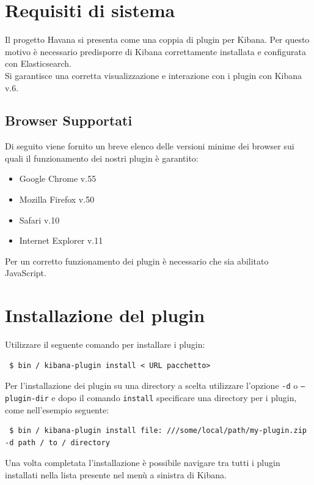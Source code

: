 \newpage
\section{Requisiti di sistema}
Il progetto Havana si presenta come una coppia di plugin per Kibana. Per questo motivo è necessario predisporre di Kibana correttamente installata e configurata con Elasticsearch.
\\ Si garantisce una corretta visualizzazione e interazione con i plugin con Kibana v.6.
\subsection{Browser Supportati}

Di seguito viene fornito un breve elenco delle versioni minime dei browser sui quali il funzionamento dei nostri plugin è garantito:
\begin{itemize}
	
	\item Google Chrome v.55
	\item Mozilla Firefox v.50
	\item Safari v.10
	\item Internet Explorer v.11
	
\end{itemize}

Per un corretto funzionamento dei plugin è necessario che sia abilitato JavaScript.

\section{Installazione del plugin}
Utilizzare il seguente comando per installare i plugin:
\begin{lstlisting}
 $ bin / kibana-plugin install < URL pacchetto>
\end{lstlisting}

Per l'installazione dei plugin su una directory a scelta utilizzare l'opzione \texttt{-d} o \texttt{--plugin-dir} e dopo il comando \texttt{install} specificare una directory per i plugin, come nell'esempio seguente:
\begin{lstlisting}
 $ bin / kibana-plugin install file: ///some/local/path/my-plugin.zip -d path / to / directory 
\end{lstlisting}

Una volta completata l'installazione è possibile navigare tra tutti i plugin installati nella lista presente nel menù a sinistra di Kibana.

